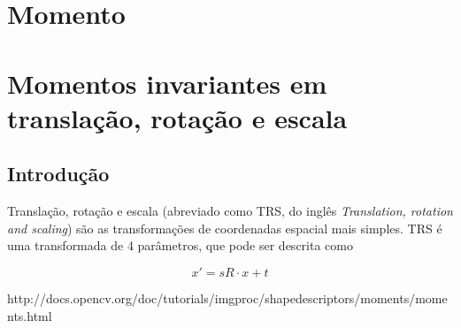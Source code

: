 \section{Momento}

\section{Momentos invariantes em translação, rotação e escala}

\subsection{Introdução}

Translação, rotação e escala (abreviado como TRS, do inglês \textit{Translation, rotation and scaling}) são as transformações de coordenadas espacial mais simples. TRS é uma transformada de 4 parâmetros, que pode ser descrita como

\[x' = sR \cdot x + t \]


http://docs.opencv.org/doc/tutorials/imgproc/shapedescriptors/moments/moments.html